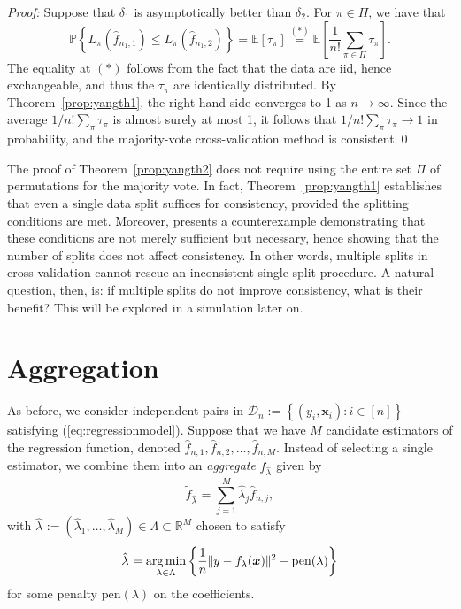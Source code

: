 \documentclass[11pt, letter paper]{article}
\newcommand{\1}{\mathmybb{1}}
\DeclareMathOperator*{\argmin}{arg\,min}
\newcommand{\R}{\mathbb{R}}
\newcommand{\0}{\emptyset}
\newcommand{\prob}{\mathbb{P}}
\newcommand{\Ep}[1]{\mathbb{E}\left[ #1 \right]}
\newcommand{\paren}[1]{\left(#1 \right)}
\newcommand{\set}[1]{\left\{ #1 \right\}}
\newcommand{\norm}[1]{|\hspace{-1pt}|#1 |\hspace{-1pt}|}
\newcommand{\normsq}[1]{\norm{#1}^{2}}
\newcommand{\data}{\mathcal{D}_{n}}
\newcommand{\x}{\boldsymbol{x}}
\newcommand{\fhat}[2]{\hat{f}_{#1, #2}}
\newcommand{\ftilde}[1]{\tilde{f}_{#1}}
\newcommand{\lambdahat}[1]{\hat{\lambda}_{#1}}
\begin{document}
\begin{myproofbox}
    \textit{Proof: }
    Suppose that \(\delta_{1}\) is asymptotically better than \(\delta_{2}\). For \(\pi\in \Pi\), we have that
    \[\prob\set{L_{\pi}\paren{\fhat{n_{1}}{1}} \leq L_{\pi}\paren{\fhat{n_{1}}{2}}} = \Ep{\tau_{\pi}} \stackrel{(*)}{=} \Ep{\frac{1}{n!}\sum_{\pi\in\Pi}\tau_{\pi}}.\]
    The equality at \((*)\) follows from the fact that the data are iid, hence exchangeable, and thus the \(\tau_\pi\) are identically distributed. By Theorem~\ref{prop:yangth1}, the right-hand side converges to 1 as \(n\to\infty\). Since the average \(1/n! \sum_{\pi}\tau_{\pi}\) is almost surely at most 1, it follows that \(1/n! \sum_{\pi}\tau_{\pi} \to 1\) in probability, and the majority-vote cross-validation method is consistent.\qed{}
\end{myproofbox}

The proof of Theorem~\ref{prop:yangth2} does not require using the entire set \(\Pi\) of permutations for the majority vote. In fact, Theorem~\ref{prop:yangth1} establishes that even a single data split suffices for consistency, provided the splitting conditions are met. Moreover, \textcite{yang_2007} presents a counterexample demonstrating that these conditions are not merely sufficient but necessary, hence showing that the number of splits does not affect consistency. In other words, multiple splits in cross-validation cannot rescue an inconsistent single-split procedure. A natural question, then, is: if multiple splits do not improve consistency, what is their benefit? This will be explored in a simulation later on.



\section{Aggregation}

As before, we consider independent pairs in \(\data := \set{\paren{y_{i}, \x_{i}}:i\in [n]}\) satisfying (\ref{eq:regressionmodel}). Suppose that we have \(M\) candidate estimators of the regression function, denoted \(\fhat{n}{1}, \fhat{n}{2}, \ldots, \fhat{n}{M}\). Instead of selecting a single estimator, we combine them into an \emph{aggregate} \(\ftilde{\lambdahat{}}\) given by
\[\ftilde{\lambdahat{}} = \sum_{j=1}^{M}\lambdahat{j} \fhat{n}{j},\]
with \(\lambdahat{}:=\paren{\lambdahat{1}, \ldots, \lambdahat{M}}\in \Lambda\subset\R^{M}\) chosen to satisfy
\begin{equation}\label{eq:weights}
    \lambdahat{} = \argmin_{\lambda\in\Lambda}\set{\frac{1}{n}\normsq{y - f_{\lambda}(\x)} - \mathrm{pen}(\lambda)}
\end{equation}
for some penalty \(\mathrm{pen}(\lambda)\) on the coefficients.
\end{document}
